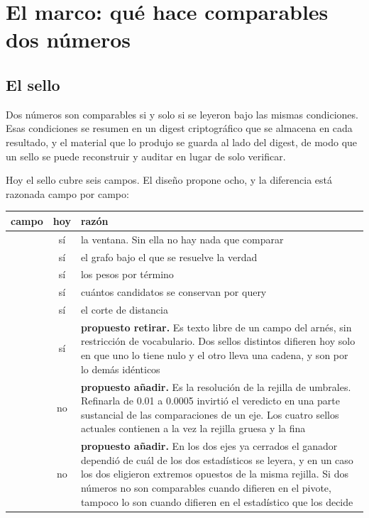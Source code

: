 \section{El marco: qué hace comparables dos números}
\label{sec:marco}

\subsection{El sello}

Dos números son comparables si y solo si se leyeron bajo las mismas condiciones.
Esas condiciones se resumen en un digest criptográfico que se almacena en cada
resultado, y el material que lo produjo se guarda al lado del digest, de modo que
un sello se puede reconstruir y auditar en lugar de solo verificar.

Hoy el sello cubre seis campos. El diseño propone ocho, y la diferencia está
razonada campo por campo:

\begin{center}
\begin{tabularx}{\linewidth}{@{}L{5.1cm} c X@{}}
\toprule
campo & hoy & razón\\
\midrule
{}            & sí & la ventana. Sin ella no hay nada que comparar\\
            & sí & el grafo bajo el que se resuelve la verdad\\
& sí & los pesos por término\\
                     & sí & cuántos candidatos se conservan por query\\
                  & sí & el corte de distancia\\
               & sí & \textbf{propuesto retirar.} Es texto libre de un campo del arnés, sin restricción de vocabulario. Dos sellos distintos difieren hoy solo en que uno lo tiene nulo y el otro lleva una cadena, y son por lo demás idénticos\\
                       & no & \textbf{propuesto añadir.} Es la resolución de la rejilla de umbrales. Refinarla de 0.01 a 0.0005 invirtió el veredicto en una parte sustancial de las comparaciones de un eje. Los cuatro sellos actuales contienen a la vez la rejilla gruesa y la fina\\
            & no & \textbf{propuesto añadir.} En los dos ejes ya cerrados el ganador dependió de cuál de los dos estadísticos se leyera, y en un caso los dos eligieron extremos opuestos de la misma rejilla. Si dos números no son comparables cuando difieren en el pivote, tampoco lo son cuando difieren en el estadístico que los decide\\
\bottomrule
\end{tabularx}
\end{center}

